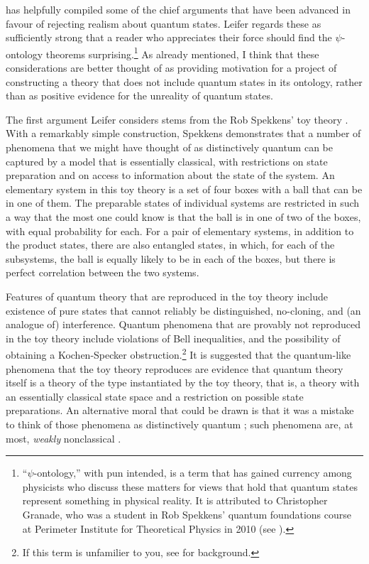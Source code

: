 \documentclass[12pt]{article}
\begin{document}
\citet{LeiferPsiOnt} has helpfully compiled some of the chief arguments that have been advanced in favour of rejecting realism about quantum states. Leifer regards these as sufficiently strong that a reader who appreciates their force should find the $\psi$-ontology theorems surprising.\footnote{``$\psi$-ontology,'' with pun intended, is a term that has gained currency among physicists who discuss these matters for views that hold that quantum states represent something in physical reality. It is attributed to Christopher Granade, who was a student  in Rob Spekkens' quantum foundations course at Perimeter Institute for Theoretical Physics in 2010 (see \citealt[p. 71]{LeiferPsiOnt}). }  As already  mentioned, I think that these considerations are better thought of as providing motivation for a project of constructing  a theory that does not include quantum states in its ontology, rather than as positive evidence for the unreality of quantum states.

The first argument Leifer considers stems from the Rob Spekkens' toy theory \citep{SpekkensToy}.  With a remarkably simple construction, Spekkens demonstrates that a number of phenomena that we might have thought of as distinctively quantum can be captured by a model that is essentially classical, with restrictions on state preparation and on access to information about the state of the system. An elementary system in this toy theory is a set of four boxes with a ball that can be in one of them.  The preparable states of individual systems are restricted in such a way that the most one could know is that the ball is in one of two of the boxes, with equal probability for each.  For a pair of elementary systems, in addition to the product states, there are also entangled states, in which, for each of the subsystems, the ball is equally likely to be in each of the boxes, but there is perfect correlation between the two systems.

Features of quantum theory that are reproduced in the toy theory include existence of pure states that cannot reliably be distinguished, no-cloning, and (an analogue of) interference. Quantum phenomena  that are provably not reproduced in the toy theory include violations of Bell inequalities, and the possibility of obtaining a Kochen-Specker obstruction.\footnote{If this term is unfamilier to you, see \citet{sep-kochen-specker} for background.} It is suggested that the quantum-like phenomena that the toy theory reproduces are evidence that quantum theory itself is a theory of the type instantiated by the toy theory, that is, a theory with an essentially classical state space and a restriction on possible state preparations.  An alternative moral that could be drawn is that  it was a mistake to think of those phenomena as distinctively quantum \citep[p. 182]{MyrvoldBoston}; such phenomena are, at most,  \emph{weakly} nonclassical  \citep[p. 92]{SpekkensQQ}.
\end{document}
